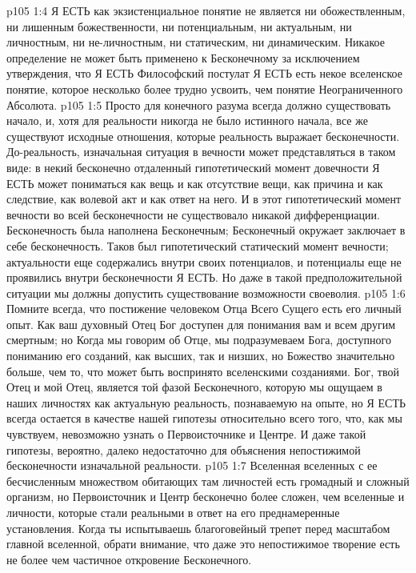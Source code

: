 \vs p105 1:4 Я ЕСТЬ как экзистенциальное понятие не является ни обожествленным, ни лишенным божественности, ни потенциальным, ни актуальным, ни личностным, ни не\hyp{}личностным, ни статическим, ни динамическим. Никакое определение не может быть применено к Бесконечному за исключением утверждения, что Я ЕСТЬ  Философский постулат Я ЕСТЬ есть некое вселенское понятие, которое несколько более трудно усвоить, чем понятие Неограниченного Абсолюта.
\vs p105 1:5 Просто для конечного разума всегда должно существовать начало, и, хотя для реальности никогда не было истинного начала, все же существуют исходные отношения, которые реальность выражает бесконечности. До\hyp{}реальность, изначальная ситуация в вечности может представляться в таком виде: в некий бесконечно отдаленный гипотетический момент довечности Я ЕСТЬ может пониматься как вещь и как отсутствие вещи, как причина и как следствие, как волевой акт и как ответ на него. И в этот гипотетический момент вечности во всей бесконечности не существовало никакой дифференциации. Бесконечность была наполнена Бесконечным; Бесконечный окружает заключает в себе бесконечность. Таков был гипотетический статический момент вечности; актуальности еще содержались внутри своих потенциалов, и потенциалы еще не проявились внутри бесконечности Я ЕСТЬ. Но даже в такой предположительной ситуации мы должны допустить существование возможности своеволия.
\vs p105 1:6 \pc Помните всегда, что постижение человеком Отца Всего Сущего есть его личный опыт. Как ваш духовный Отец Бог доступен для понимания вам и всем другим смертным; но  Когда мы говорим об Отце, мы подразумеваем Бога, доступного пониманию его созданий, как высших, так и низших, но Божество значительно больше, чем то, что может быть воспринято вселенскими созданиями. Бог, твой Отец и мой Отец, является той фазой Бесконечного, которую мы ощущаем в наших личностях как актуальную реальность, познаваемую на опыте, но Я ЕСТЬ всегда остается в качестве нашей гипотезы относительно всего того, что, как мы чувствуем, невозможно узнать о Первоисточнике и Центре. И даже такой гипотезы, вероятно, далеко недостаточно для объяснения непостижимой бесконечности изначальной реальности.
\vs p105 1:7 Вселенная вселенных с ее бесчисленным множеством обитающих там личностей есть громадный и сложный организм, но Первоисточник и Центр бесконечно более сложен, чем вселенные и личности, которые стали реальными в ответ на его преднамеренные установления. Когда ты испытываешь благоговейный трепет перед масштабом главной вселенной, обрати внимание, что даже это непостижимое творение есть не более чем частичное откровение Бесконечного.
